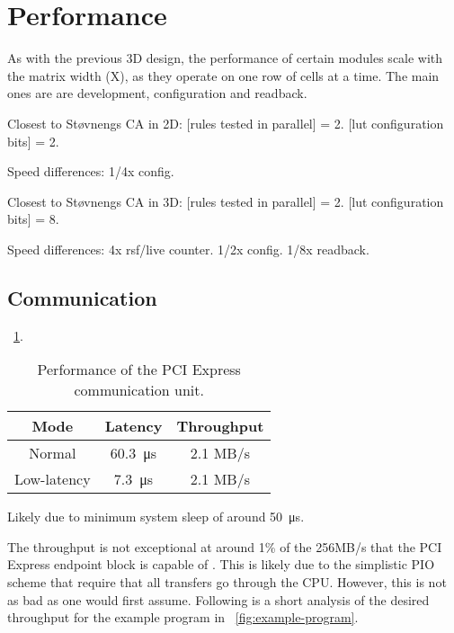 \section{Performance}

\TODO

As with the previous 3D design, the performance of certain modules scale with the matrix width (X), as they operate on one row of cells at a time.
The main ones are are development, configuration and readback.

Closest to Støvnengs CA in 2D:
[rules tested in parallel] = 2.
[lut configuration bits] = 2.

Speed differences:
1/4x config.

Closest to Støvnengs CA in 3D:
[rules tested in parallel] = 2.
[lut configuration bits] = 8.

Speed differences:
4x rsf/live counter.
1/2x config.
1/8x readback.


\subsection{Communication}

\TODO
\tablename~\ref{tab:communication-performance}.

\begin{table}[!ht]
    \renewcommand{\arraystretch}{1.4}
    \centering
    \begin{tabular}{c|c|c}
        \bfseries Mode & \bfseries Latency & \bfseries Throughput \\
        \hline
        Normal & \SI{60.3}{\micro\second} & 2.1 MB/s \\
        Low-latency & \SI{7.3}{\micro\second} & 2.1 MB/s \\
    \end{tabular}
    \caption[Communication performance]{
        Performance of the PCI Express communication unit.
    }
    \label{tab:communication-performance}
\end{table}

\TODO
Likely due to minimum system sleep of around \SI{50}{\micro\second}.

The throughput is not exceptional at around 1\% of the 256MB/s that the PCI Express endpoint block is capable of \cite{ug672}.
This is likely due to the simplistic PIO scheme that require that all transfers go through the CPU.
However, this is not as bad as one would first assume.
Following is a short analysis of the desired throughput for the example program in \figurename~\ref{fig:example-program}.

